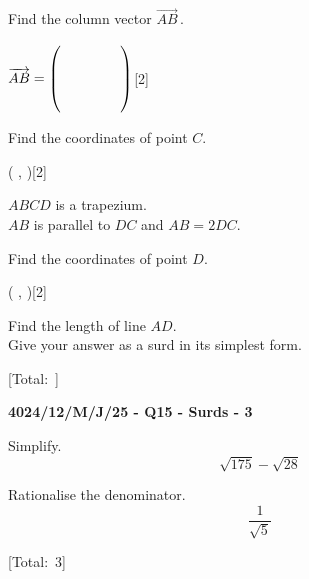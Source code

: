 \documentclass[11pt,a4paper]{article}
\newcommand{\ansval}[3]{%
  \par\vspace{5mm}%
  \noindent\hspace*{3.5cm}#1\hspace{0.5em}\dotfill\hspace{0.5em}#2\hspace{0.5em}\makebox[1.1cm][r]{#3}\par
  \vspace{3mm}%
}
\newcommand{\swmarks}{}
\newcommand{\examq}[4]{%
  \gdef\swmarks{#4}%
  \par\addvspace{16pt}\noindent
  {\large\bfseries #1 - Q#2 - #3 - #4}\par\vspace{5pt}%
}
\newcommand{\total}{\par\vspace{2mm}\noindent\hspace*{\fill}[Total:\ \swmarks]\par\vspace{2mm}}
\begin{document}
\begin{parts}
  \item Find the column vector $\overrightarrow{AB}$\,.
  \vspace{3cm}
  \par\vspace{5mm}\noindent\hspace*{\fill}$\overrightarrow{AB} = \left(\rule{0pt}{10mm}\hspace{1.5cm}\right)$\hspace{0.6em}\mbox{[2]}\par\vspace{3mm}

  \item Find the coordinates of point $C$.
  \vspace{3cm}
  \par\vspace{5mm}\noindent\hspace*{\fill}(\makebox[2.4cm]{\dotfill} , \makebox[2.4cm]{\dotfill})\hspace{0.6em}\mbox{[2]}\par\vspace{3mm}

  \item $ABCD$ is a trapezium.\\
  $AB$ is parallel to $DC$ and $AB = 2DC$.
  \begin{subparts}
    \item Find the coordinates of point $D$.
    \vspace{3cm}
    \par\vspace{5mm}\noindent\hspace*{\fill}(\makebox[2.4cm]{\dotfill} , \makebox[2.4cm]{\dotfill})\hspace{0.6em}\mbox{[2]}\par\vspace{3mm}

    \item Find the length of line $AD$.\\
    Give your answer as a surd in its simplest form.
    \vspace{5cm}
    \ansval{}{}{[3]}
  \end{subparts}
\end{parts}
\total

\examq{4024/12/M/J/25}{15}{Surds}{3}
\begin{parts}
  \item Simplify.
  \[\sqrt{175}-\sqrt{28}\]
  \vspace{3cm}
  \ansval{}{}{[2]}

  \item Rationalise the denominator.
  \[\dfrac{1}{\sqrt{5}}\]
  \vspace{2cm}
  \ansval{}{}{[1]}
\end{parts}
\total
\end{document}
